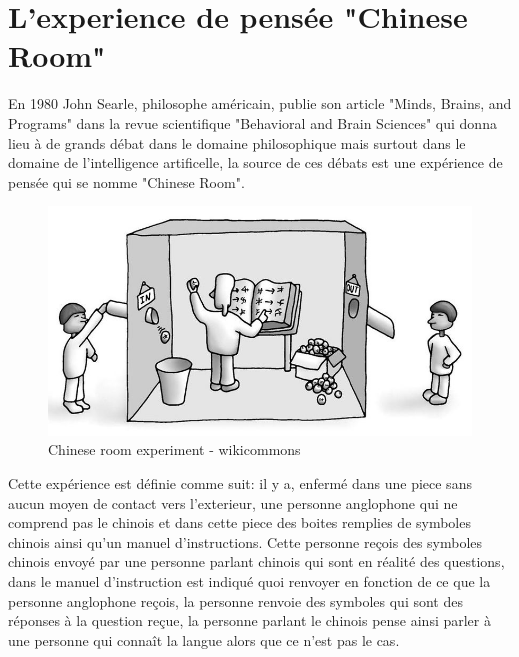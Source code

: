 \section{L'experience de pensée "Chinese Room"}
En 1980 John Searle, philosophe américain, publie son article "Minds, Brains, and Programs" dans la revue
scientifique "Behavioral and Brain Sciences" qui donna lieu à de grands débat dans le domaine philosophique
mais surtout dans le domaine de l'intelligence artificelle,
la source de ces débats est une expérience de pensée qui se nomme "Chinese Room". \newline

\begin{figure}[H]
    \centering
    \includegraphics[width=1\textwidth]{Images/chineseroom}
    \caption{Chinese room experiment - wikicommons}
	\label{fig:chineseroom}
\end{figure}

Cette expérience est définie comme suit: \newline
il y a, enfermé dans une piece sans aucun moyen de contact vers l'exterieur, une personne anglophone qui ne comprend
pas le chinois et dans cette piece des boites remplies de symboles chinois ainsi qu'un manuel d'instructions.
Cette personne reçois des symboles chinois envoyé par une personne parlant chinois qui sont en réalité des questions,
dans le manuel d'instruction est indiqué quoi renvoyer en fonction de ce que la personne anglophone reçois,
la personne renvoie des symboles qui sont des réponses à la question reçue, la personne parlant le chinois
pense ainsi parler à une personne qui connaît la langue alors que ce n'est pas le cas.

